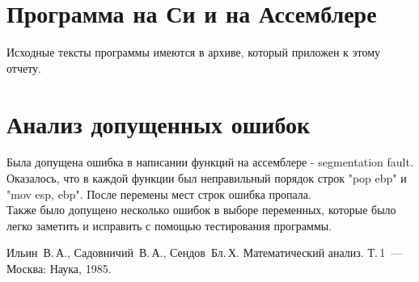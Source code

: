 \documentclass[a4paper,12pt,titlepage,finall]{article}
\begin{document}
\section{Программа на Си и на Ассемблере}

Исходные тексты программы имеются в архиве, который приложен к этому отчету.

\newpage

\section{Анализ допущенных ошибок} 
Была допущена ошибка в написании функций на ассемблере - segmentation fault. Оказалось, что в каждой функции был неправильный порядок строк "pop ebp" и "mov esp, ebp". После перемены мест строк ошибка пропала. \\
Также было допущено несколько ошибок в выборе переменных, которые было легко заметить и исправить с помощью тестирования программы.

\newpage
\begin{raggedright}
\begin{thebibliography}{99}
 Ильин~В.\,А., Садовничий~В.\,А., Сендов~Бл.\,Х. Математический анализ. Т.\,1~---
    Москва: Наука, 1985.
\end{thebibliography}
\end{raggedright}
\end{document}
